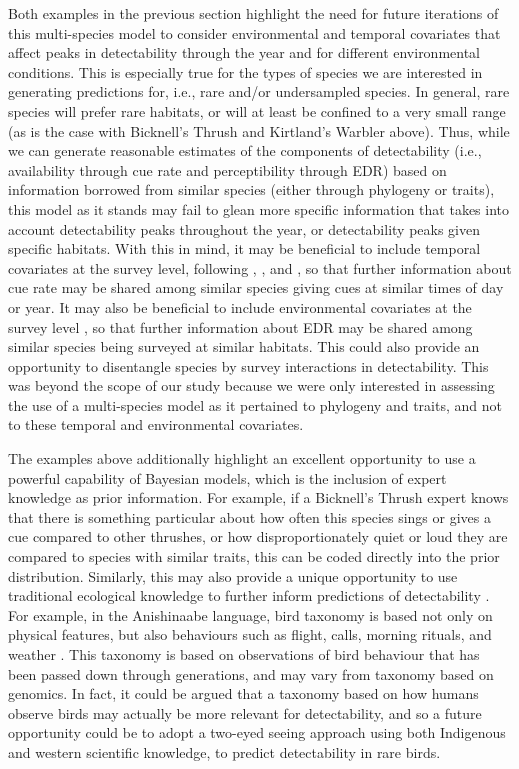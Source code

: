 \documentclass[12pt]{article}
\begin{document}
Both examples in the previous section highlight the need for future iterations of this multi-species model to consider environmental and temporal covariates that affect peaks in detectability through the year and for different environmental conditions. 
This is especially true for the types of species we are interested in generating predictions for, i.e., rare and/or undersampled species.
In general, rare species will prefer rare habitats, or will at least be confined to a very small range (as is the case with Bicknell’s Thrush and Kirtland’s Warbler above). 
Thus, while we can generate reasonable estimates of the components of detectability (i.e., availability through cue rate and perceptibility through EDR) based on information borrowed from similar species (either through phylogeny or traits), this model as it stands may fail to glean more specific information that takes into account detectability peaks throughout the year, or detectability peaks given specific habitats. 
With this in mind, it may be beneficial to include temporal covariates at the survey level, following \citet{solymos_calibrating_2013}, \citet{solymos_evaluating_2018}, and \citet{edwards_point_2023}, so that further information about cue rate may be shared among similar species giving cues at similar times of day or year.
It may also be beneficial to include environmental covariates at the survey level \citep{solymos_calibrating_2013, edwards_point_2023}, so that further information about EDR may be shared among similar species being surveyed at similar habitats.
This could also provide an opportunity to disentangle species by survey interactions in detectability.
This was beyond the scope of our study because we were only interested in assessing the use of a multi-species model as it pertained to phylogeny and traits, and not to these temporal and environmental covariates.

\par The examples above additionally highlight an excellent opportunity to use a powerful capability of Bayesian models, which is the inclusion of expert knowledge as prior information. 
For example, if a Bicknell’s Thrush expert knows that there is something particular about how often this species sings or gives a cue compared to other thrushes, or how disproportionately quiet or loud they are compared to species with similar traits, this can be coded directly into the prior distribution.
Similarly, this may also provide a unique opportunity to use traditional ecological knowledge to further inform predictions of detectability \citep{wardfear_sharper_2019}.
For example, in the Anishinaabe language, bird taxonomy is based not only on physical features, but also behaviours such as flight, calls, morning rituals, and weather \citep{pitawanakwat_evening_2022}.
This taxonomy is based on observations of bird behaviour that has been passed down through generations, and may vary from taxonomy based on genomics.
In fact, it could be argued that a taxonomy based on how humans observe birds may actually be more relevant for detectability, and so a future opportunity could be to adopt a two-eyed seeing approach \cite{reid_twoeyed_2021} using both Indigenous and western scientific knowledge, to predict detectability in rare birds.
\end{document}
